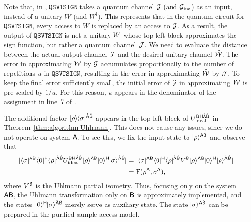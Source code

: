 Note that, in , $\mathtt{QSVTSIGN}$ takes a quantum channel ${\mathcal{G}}$ (and ${\mathcal{G}}_{\rm inv}$) as an input, instead of a unitary $W$ (and $W^\dag$).
This represents that in the quantum circuit for $\mathtt{QSVTSIGN}$, every access to $W$ is replaced by an access to ${\mathcal{G}}$. 
As a result, the output of $\mathtt{QSVTSIGN}$ is not a unitary $\tilde{W}$ whose top-left block approximates the sign function, but rather a quantum channel ${\mathcal{J}}$.
We need to evaluate the distance between the actual output channel ${\mathcal{J}}$ and the desired unitary channel $\tilde{{\mathcal{W}}}$.
The error in approximating ${\mathcal{W}}$ by ${\mathcal{G}}$ accumulates proportionally to the number of repetitions $u$ in $\mathtt{QSVTSIGN}$, resulting in the error in approximating $\tilde{{\mathcal{W}}}$ by ${\mathcal{J}}$.
To keep the final error sufficiently small, the initial error of ${\mathcal{G}}$ in approximating ${\mathcal{W}}$ is pre-scaled by $1/u$.
For this reason, $u$ appears in the denominator of the assignment in line~7 of .








The additional factor $|\rho\rangle\langle\sigma|^{\hat{{\mathsf{A}}}\hat{{\mathsf{B}}}}$ appears in the top-left block of $U_{\rm ideal}^{{\mathsf{B}}{\mathsf{H}}\hat{{\mathsf{A}}}\hat{{\mathsf{B}}}}$ in Theorem~\ref{thm:algorithm Uhlmann}.
This does not cause any issues, since we do not operate on system ${\mathsf{A}}$.
To see this, we fix the input state to $|\rho\rangle^{{\mathsf{A}}{\mathsf{B}}}$ and observe that 
\begin{align}
    |\langle\sigma|^{{\mathsf{A}}{\mathsf{B}}}\langle0|^{\mathsf{H}}\langle\rho|^{\hat{{\mathsf{A}}}\hat{{\mathsf{B}}}}U_{\rm ideal}^{{\mathsf{B}}{\mathsf{H}}\hat{{\mathsf{A}}}\hat{{\mathsf{B}}}}|\rho\rangle^{{\mathsf{A}}{\mathsf{B}}}|0\rangle^{\mathsf{H}}|\sigma\rangle^{\hat{{\mathsf{A}}}\hat{{\mathsf{B}}}}|
    &= |\langle\sigma|^{{\mathsf{A}}{\mathsf{B}}}\langle0|^{\mathsf{H}} \langle\rho|^{\hat{{\mathsf{A}}}\hat{{\mathsf{B}}}}V^{\mathsf{B}}|\rho\rangle^{{\mathsf{A}}{\mathsf{B}}}|0\rangle^{\mathsf{H}}|\rho\rangle^{\hat{{\mathsf{A}}}\hat{{\mathsf{B}}}}| \\
    &=  {\mathrm{F}}(\rho^{\mathsf{A}}, \sigma^{\mathsf{A}}),
\end{align} 
where $V^{\mathsf{B}}$ is the Uhlmann partial isometry.
Thus, focusing only on the system ${\mathsf{A}}{\mathsf{B}}$, the Uhlmann transformation only on ${\mathsf{B}}$ is approximately implemented, and the states $|0\rangle^{\mathsf{H}}|\sigma\rangle^{\hat{{\mathsf{A}}}\hat{{\mathsf{B}}}}$ merely serve as auxiliary state.
The state $|\sigma\rangle^{\hat{{\mathsf{A}}}\hat{{\mathsf{B}}}}$ can be prepared in the purified sample access model.

